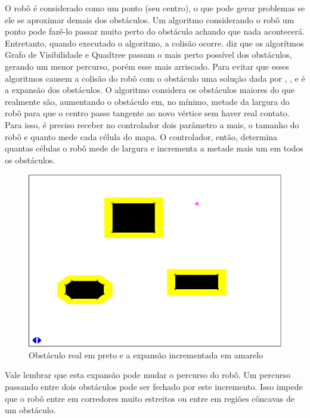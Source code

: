 O robô é considerado como um ponto (seu centro), o que pode gerar problemas se ele se aproximar demais dos obstáculos. Um algoritmo considerando o robô um ponto pode fazê-lo passar muito perto do obstáculo achando que nada acontecerá. Entretanto, quando executado o algoritmo, a colisão ocorre. \cite{Guzman2008} diz que os algorítmos Grafo de Visibilidade e Quadtree passam o mais perto possível dos obstáculos, gerando um menor percurso, porém esse mais arriscado. Para evitar que esses algoritmos causem a colisão do robô com o obstáculo uma solução dada por \cite{Souza2008}, \cite{Guzman2008}, \cite{Siegwart2004} e \cite{Thomsen2010} é a expansão dos obstáculos. O algoritmo considera os obstáculos maiores do que realmente são, aumentando o obstáculo em, no mínimo, metade da largura do robô para que o centro passe tangente ao novo vértice sem haver real contato. Para isso, é preciso receber no controlador dois parâmetro a mais, o tamanho do robô e quanto mede cada célula do mapa. O controlador, então, determina quantas células o robô mede de largura e incrementa a metade mais um em todos os obstáculos.

\begin{figure}[h]
	\centering
	\label{fig33}
		\includegraphics[keepaspectratio=true,scale=0.5]{figuras/expansao.png}
	\caption{Obstáculo real em preto e a expansão incrementada em amarelo \cite{MRIT_SITE}}
\end{figure}

Vale lembrar que esta expansão pode mudar o percurso do robô. Um percurso passando entre dois obstáculos pode ser fechado por este incremento. Isso impede que o robô entre em corredores muito estreitos ou entre em regiões côncavas de um obstáculo.

